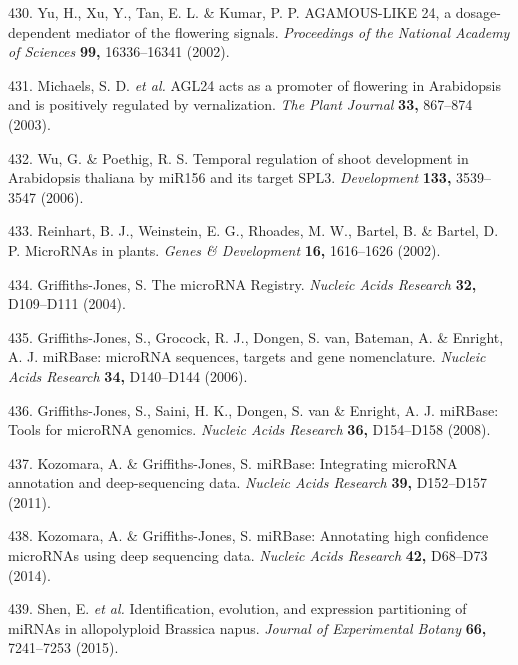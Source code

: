 \documentclass[12pt,]{book}
\begin{document}
\hypertarget{ref-yu_agamous_like_2002}{}
430. Yu, H., Xu, Y., Tan, E. L. \& Kumar, P. P. AGAMOUS-LIKE 24, a
dosage-dependent mediator of the flowering signals. \emph{Proceedings of
the National Academy of Sciences} \textbf{99,} 16336--16341 (2002).

\hypertarget{ref-michaels_agl24_2003}{}
431. Michaels, S. D. \emph{et al.} AGL24 acts as a promoter of flowering
in Arabidopsis and is positively regulated by vernalization. \emph{The
Plant Journal} \textbf{33,} 867--874 (2003).

\hypertarget{ref-wu_temporal_2006}{}
432. Wu, G. \& Poethig, R. S. Temporal regulation of shoot development
in Arabidopsis thaliana by miR156 and its target SPL3.
\emph{Development} \textbf{133,} 3539--3547 (2006).

\hypertarget{ref-reinhart_micrornas_2002}{}
433. Reinhart, B. J., Weinstein, E. G., Rhoades, M. W., Bartel, B. \&
Bartel, D. P. MicroRNAs in plants. \emph{Genes \& Development}
\textbf{16,} 1616--1626 (2002).

\hypertarget{ref-griffiths_jones_microrna_2004}{}
434. Griffiths-Jones, S. The microRNA Registry. \emph{Nucleic Acids
Research} \textbf{32,} D109--D111 (2004).

\hypertarget{ref-griffiths_jones_mirbase_2006}{}
435. Griffiths-Jones, S., Grocock, R. J., Dongen, S. van, Bateman, A. \&
Enright, A. J. miRBase: microRNA sequences, targets and gene
nomenclature. \emph{Nucleic Acids Research} \textbf{34,} D140--D144
(2006).

\hypertarget{ref-griffiths_jones_mirbase_2008}{}
436. Griffiths-Jones, S., Saini, H. K., Dongen, S. van \& Enright, A. J.
miRBase: Tools for microRNA genomics. \emph{Nucleic Acids Research}
\textbf{36,} D154--D158 (2008).

\hypertarget{ref-kozomara_mirbase_2011}{}
437. Kozomara, A. \& Griffiths-Jones, S. miRBase: Integrating microRNA
annotation and deep-sequencing data. \emph{Nucleic Acids Research}
\textbf{39,} D152--D157 (2011).

\hypertarget{ref-kozomara_mirbase_2014}{}
438. Kozomara, A. \& Griffiths-Jones, S. miRBase: Annotating high
confidence microRNAs using deep sequencing data. \emph{Nucleic Acids
Research} \textbf{42,} D68--D73 (2014).

\hypertarget{ref-shen_identification_2015}{}
439. Shen, E. \emph{et al.} Identification, evolution, and expression
partitioning of miRNAs in allopolyploid Brassica napus. \emph{Journal of
Experimental Botany} \textbf{66,} 7241--7253 (2015).
\end{document}
